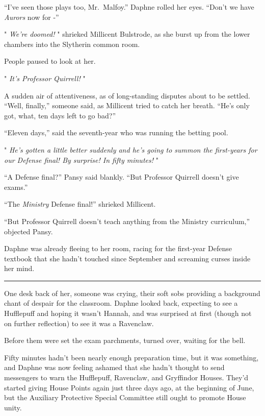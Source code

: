 ``I've seen those plays too, Mr.~Malfoy.'' Daphne rolled her eyes.
``Don't we have \emph{Aurors} now for -''

" \emph{We're doomed!} " shrieked Millicent Bulstrode, as she burst up
from the lower chambers into the Slytherin common room.

People paused to look at her.

" \emph{It's Professor Quirrell!} "

A sudden air of attentiveness, as of long-standing disputes about to be
settled. ``Well, finally,'' someone said, as Millicent tried to catch
her breath. ``He's only got, what, ten days left to go bad?''

``Eleven days,'' said the seventh-year who was running the betting pool.

" \emph{He's gotten a little better suddenly and he's going to summon
the first-years for our Defense final! By surprise! In fifty minutes!} "

``A Defense final?'' Pansy said blankly. ``But Professor Quirrell
doesn't give exams.''

``The \emph{Ministry} Defense final!'' shrieked Millicent.

``But Professor Quirrell doesn't teach anything from the Ministry
curriculum,'' objected Pansy.

Daphne was already fleeing to her room, racing for the first-year
Defense textbook that she hadn't touched since September and screaming
curses inside her mind.

\begin{center}\rule{3in}{0.4pt}\end{center}

One desk back of her, someone was crying, their soft sobs providing a
background chant of despair for the classroom. Daphne looked back,
expecting to see a Hufflepuff and hoping it wasn't Hannah, and was
surprised at first (though not on further reflection) to see it was a
Ravenclaw.

Before them were set the exam parchments, turned over, waiting for the
bell.

Fifty minutes hadn't been nearly enough preparation time, but it was
something, and Daphne was now feeling ashamed that she hadn't thought to
send messengers to warn the Hufflepuff, Ravenclaw, and Gryffindor
Houses. They'd started giving House Points again just three days ago, at
the beginning of June, but the Auxiliary Protective Special Committee
still ought to promote House unity.


